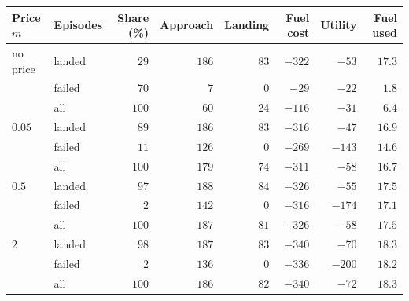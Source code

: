 \begin{tabular}{llrrrrrr}
\toprule
Price $m$ & Episodes & Share (\%) & Approach & Landing & Fuel cost & Utility & Fuel used \\
\midrule
no price & landed & $29$ & $186$ & $83$ & $-322$ & $-53$ & $17.3$ \\
 & failed & $70$ & $7$ & $0$ & $-29$ & $-22$ & $1.8$ \\
 & all & $100$ & $60$ & $24$ & $-116$ & $-31$ & $6.4$ \\
\addlinespace
$0.05$ & landed & $89$ & $186$ & $83$ & $-316$ & $-47$ & $16.9$ \\
 & failed & $11$ & $126$ & $0$ & $-269$ & $-143$ & $14.6$ \\
 & all & $100$ & $179$ & $74$ & $-311$ & $-58$ & $16.7$ \\
\addlinespace
$0.5$ & landed & $97$ & $188$ & $84$ & $-326$ & $-55$ & $17.5$ \\
 & failed & $2$ & $142$ & $0$ & $-316$ & $-174$ & $17.1$ \\
 & all & $100$ & $187$ & $81$ & $-326$ & $-58$ & $17.5$ \\
\addlinespace
$2$ & landed & $98$ & $187$ & $83$ & $-340$ & $-70$ & $18.3$ \\
 & failed & $2$ & $136$ & $0$ & $-336$ & $-200$ & $18.2$ \\
 & all & $100$ & $186$ & $82$ & $-340$ & $-72$ & $18.3$ \\
\bottomrule
\end{tabular}
